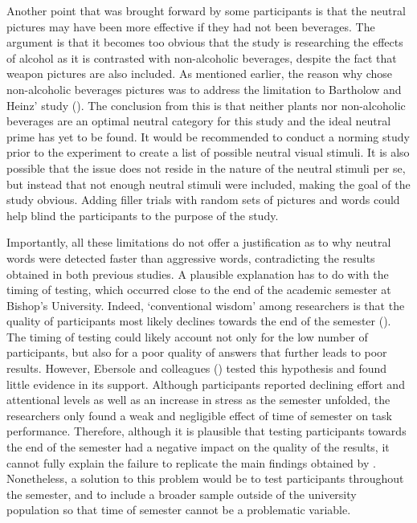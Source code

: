\documentclass[serif, authorddate, twocolumn, empirical]{jote-article}
\begin{document}
Another point that was brought forward by some participants is that the neutral pictures may have been more effective if they had not been beverages. The argument is that it becomes too obvious that the study is researching the effects of alcohol as it is contrasted with non-alcoholic beverages, despite the fact that weapon pictures are also included. As mentioned earlier, the reason why \textcite{SubraMullerBegueLBushmanDelmas2010} chose non-alcoholic beverages pictures was to address the limitation to Bartholow and Heinz’ study (\cite{BartholowHeinz2006}). The conclusion from this is that neither plants nor non-alcoholic beverages are an optimal neutral category for this study and the ideal neutral prime has yet to be found. It would be recommended to conduct a norming study prior to the experiment to create a list of possible neutral visual stimuli. It is also possible that the issue does not reside in the nature of the neutral stimuli per se, but instead that not enough neutral stimuli were included, making the goal of the study obvious. Adding filler trials with random sets of pictures and words could help blind the participants to the purpose of the study. 

Importantly, all these limitations do not offer a justification as to why neutral words were detected faster than aggressive words, contradicting the results obtained in both previous studies. A plausible explanation has to do with the timing of testing, which occurred close to the end of the academic semester at Bishop’s University. Indeed, ‘conventional wisdom’ among researchers is that the quality of participants most likely declines towards the end of the semester (\cite{EbersoleAthertonBelangerSkulborstadAllenBanks2016}). The timing of testing could likely account not only for the low number of participants, but also for a poor quality of answers that further leads to poor results. However, Ebersole and colleagues (\cite{EbersoleAthertonBelangerSkulborstadAllenBanks2016}) tested this hypothesis and found little evidence in its support. Although participants reported declining effort and attentional levels as well as an increase in stress as the semester unfolded, the researchers only found a weak and negligible effect of time of semester on task performance. Therefore, although it is plausible that testing participants towards the end of the semester had a negative impact on the quality of the results, it cannot fully explain the failure to replicate the main findings obtained by \textcite{BartholowHeinz2006}. Nonetheless, a solution to this problem would be to test participants throughout the semester, and to include a broader sample outside of the university population so that time of semester cannot be a problematic variable. 
\end{document}
